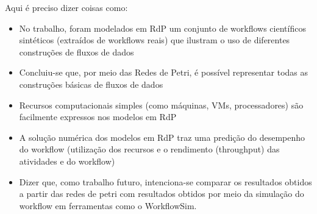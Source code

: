 \documentclass[a4paper,10pt]{article}
\begin{document}
Aqui é preciso dizer coisas como:
\begin{itemize}
\item No trabalho, foram modelados em RdP um conjunto de workflows científicos sintéticos (extraídos de workflows reais) que ilustram o uso de diferentes construções de fluxos de dados 
\item Concluiu-se que, por meio das Redes de Petri, é possível representar todas as construções básicas de fluxos de dados
\item Recursos computacionais simples (como máquinas, VMs, processadores) são facilmente expressos nos modelos em RdP
\item A solução numérica dos modelos em RdP traz uma predição do desempenho do workflow (utilização dos recursos e o rendimento (throughput) das atividades e do workflow)
\item Dizer que, como trabalho futuro, intenciona-se comparar os resultados obtidos a partir das redes de petri com resultados obtidos por meio da simulação do workflow em ferramentas como o WorkflowSim.
\end{itemize}



\end{document}
